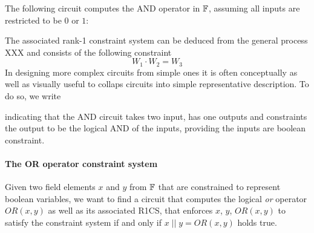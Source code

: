 The following circuit computes the AND operator in $\mathbb{F}$, assuming all inputs are restricted to be $0$ or $1$:
\begin{center}
\end{center}
The associated rank-1 constraint system can be deduced from the general process XXX and consists of the following constraint
\begin{equation}
 W_1 \cdot W_2 = W_3
\end{equation}
In designing more complex circuits from simple ones it is often conceptually as well as visually useful to collaps circuits into simple representative description. To do so, we write 
\begin{center}
\end{center}
indicating that the AND circuit takes two input, has one outputs and constraints the output to be the logical AND of the inputs, providing the inputs are boolean constraint.
\paragraph{The OR operator constraint system} Given two field elements $x$ and $y$ from $\mathbb{F}$ that are constrained to represent boolean variables, we want to find a circuit that computes the logical \textit{or} operator $OR(x,y)$ as well as its associated R1CS, that enforces $x$, $y$, $OR(x,y)$ to satisfy the constraint system if and only if $x\; || \; y =OR(x,y)$ holds true. 

